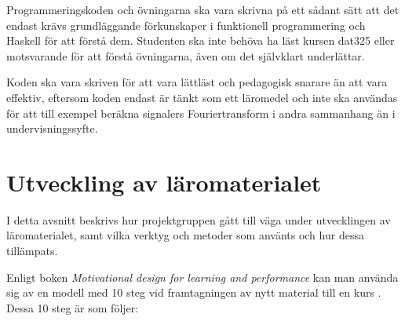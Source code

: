 \documentclass[12pt,a4paper,twoside,openright]{article}
\begin{document}
Programmeringskoden och övningarna ska vara skrivna på ett sådant sätt att
det endast krävs grundläggande förkunskaper i funktionell
programmering och Haskell för att förstå dem. Studenten ska inte
behöva ha läst kursen \gls{dat325} eller motsvarande för att förstå
övningarna, även om det självklart underlättar.

Koden ska vara skriven för att vara lättläst och pedagogisk snarare
än att vara effektiv, eftersom koden endast är tänkt som ett läromedel
och inte ska användas för att till exempel beräkna signalers Fouriertransform
i andra sammanhang än i undervisningssyfte.

\newpage


\section{Utveckling av läromaterialet}
\label{sec:utveckling}
I detta avsnitt beskrivs hur projektgruppen gått till väga under
utvecklingen av läromaterialet, samt vilka verktyg och metoder som
använts och hur dessa tillämpats.

Enligt boken \textit{Motivational design for learning and performance}
kan man använda sig av en modell med 10 steg vid framtagningen av nytt
material till en kurs \cite{motivational_design}. Dessa 10 steg är som
följer:
\end{document}
